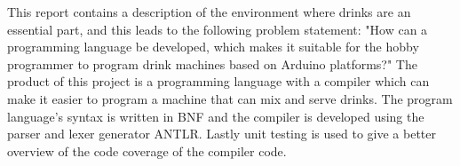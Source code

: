 This report contains a description of the environment where drinks are an essential part, and this leads to the following problem statement:
"How can a programming language be developed, which makes it suitable for the hobby programmer to program drink machines based on Arduino platforms?"
The product of this project is a programming language with a compiler which can make it easier to program a machine that can mix and serve drinks. The program language's syntax is written in BNF and the compiler is developed using the parser and lexer generator ANTLR. Lastly unit testing is used to give a better overview of the code coverage of the compiler code.